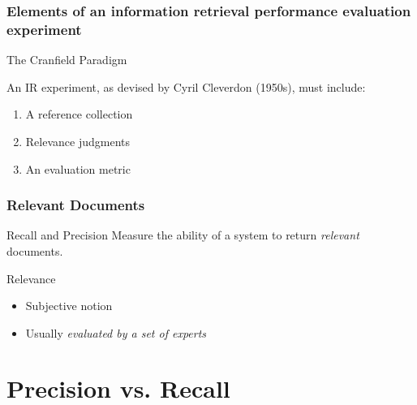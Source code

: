 \documentclass[svgnames]{beamer}
\begin{document}

\begin{frame}
  \frametitle{Elements of an information retrieval performance evaluation experiment}

\begin{block}{The Cranfield Paradigm}

An IR experiment, as devised by Cyril Cleverdon (1950s), must include:

\begin{enumerate}

\item A reference collection
\item Relevance judgments
\item An evaluation metric

\end{enumerate}

\end{block}


\end{frame}


\begin{frame}  \frametitle{Relevant Documents}
  
  \begin{block}{Recall and Precision} 
    Measure the ability of a system to return \emph{relevant} documents.
  \end{block}
  
  \begin{block}{Relevance}
    \begin{itemize}
    \item Subjective notion
    \item Usually \emph{evaluated by a set of experts}
    \end{itemize}
  \end{block}
\end{frame}


\section{Precision vs. Recall}
\end{document}
